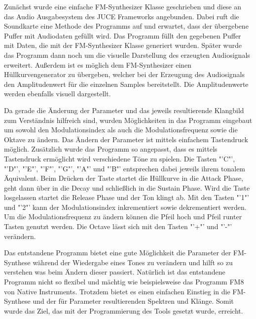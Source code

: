 Zunächst wurde eine einfache FM-Synthesizer Klasse geschrieben und diese an das Audio Ausgabesystem des JUCE Frameworks angebunden. Dabei ruft die Soundkarte eine Methode des Programms auf und erwartet, dass der übergebene Puffer mit Audiodaten gefüllt wird. Das Programm füllt den gegebenen Puffer mit Daten, die mit der FM-Synthesizer Klasse generiert wurden. Später wurde das Programm dann noch um die visuelle Darstellung des erzeugten Audiosignals erweitert. Außerdem ist es möglich dem FM-Synthesizer einen Hüllkurvengenerator zu übergeben, welcher bei der Erzeugung des Audiosignals den Amplitudenwert für die einzelnen Samples bereitstellt. Die Amplitudenwerte werden ebenfalls visuell dargestellt.

Da gerade die Änderung der Parameter und das jeweils resultierende Klangbild zum Verständnis hilfreich sind, wurden Möglichkeiten in das Programm eingebaut um sowohl den Modulationsindex als auch die Modulationsfrequenz sowie die Oktave zu ändern. Das Ändern der Parameter ist mittels einfachem Tastendruck möglich. Zusätzlich wurde das Programm so angepasst, dass es mittels Tastendruck ermöglicht wird verschiedene Töne zu spielen. Die Tasten "'C"', "'D"', "'E"', "'F"', "'G"', "'A"' und "'B"' entsprechen dabei jeweils ihrem tonalem Äquivalent. Beim Drücken der Taste startet die Hüllkurve in die Attack Phase, geht dann über in die Decay und schließlich in die Sustain Phase. Wird die Taste losgelassen startet die Release Phase und der Ton klingt ab. Mit den Tasten "'1"' und "'2"' kann der Modulationsindex inkrementiert sowie dekrementiert werden. Um die Modulationsfrequenz zu ändern können die Pfeil hoch und Pfeil runter Tasten genutzt werden. Die Octave lässt sich mit den Tasten "'+"' und "'-"' verändern.

Das entstandene Programm bietet eine gute Möglichkeit die Parameter der FM-Synthese während der Wiedergabe eines Tones zu verändern und hilft so zu verstehen was beim Ändern dieser passiert. Natürlich ist das entstandene Programm nicht so flexibel und mächtig wie beispielsweise das Programm FM8 von Native Instruments. Trotzdem bietet es einen einfachen Einstieg in die FM-Synthese und der für Parameter resultierenden Spektren und Klänge. Somit wurde das Ziel, das mit der Programmierung des Tools gesetzt wurde, erreicht.
\FloatBarrier
